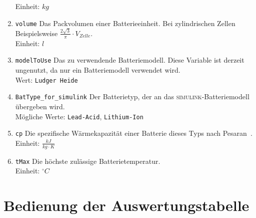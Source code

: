 \begin{enumerate}
	Einheit: $kg$
	\item \texttt{volume} Das Packvolumen einer Batterieeinheit. Bei zylindrischen Zellen Beispielsweise $\frac{2\sqrt{3}}{\pi} \cdot V_{Zelle}$.\\
	Einheit: $l$
	\item \texttt{modelToUse} Das zu verwendende Batteriemodell. Diese Variable ist derzeit ungenutzt, da nur ein Batteriemodell verwendet wird.\\
	Wert: \texttt{Ludger Heide}
	\item \texttt{BatType\_for\_simulink} Der Batterietyp, der an das \textsc{simulink}-Batteriemodell übergeben wird.\\
	Mögliche Werte: \texttt{Lead-Acid}, \texttt{Lithium-Ion}
	\item \texttt{cp} Die spezifische Wärmekapazität einer Batterie dieses Typs nach Pesaran~\cite{pesaran2001battery}.\\
	Einheit: $\frac{kJ}{kg\cdot K}$
	\item \texttt{tMax} Die höchste zulässige Batterietemperatur.\\
	Einheit: $^{\circ}C$
\end{enumerate}

\section{Bedienung der Auswertungstabelle}